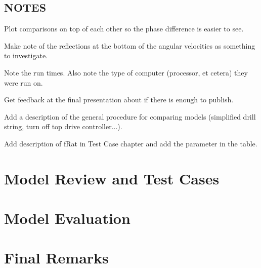 \documentclass{lebook}
\begin{document}


\frontmatter{}
\pagestyle{cnpcusareportothermatter}

\tableofcontents{}
\listoffigures{}
\listoftables{}



\mainmatter{}
\pagestyle{cnpcusareportothermatter}




\chapter{NOTES}
\begin{bulletedlist}
	\item Plot comparisons on top of each other so the phase difference is easier to see.
	\item Make note of the reflections at the bottom of the angular velocities as something to investigate.
	\item Note the run times.  Also note the type of computer (processor, et cetera) they were run on.
	\item Get feedback at the final presentation about if there is enough to publish.
	\item Add a description of the general procedure for comparing models (simplified drill string, turn off top drive controller...).
    \item Add description of fRat in Test Case chapter and add the parameter in the table.
\end{bulletedlist}


\part{Model Review and Test Cases}
\label{prt:review}


\part{Model Evaluation}
\label{prt:evaluation}



\part{Final Remarks}
\label{prt:finalremarks}

\end{document}
